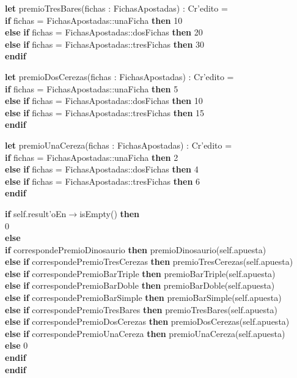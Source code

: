 \begin{itemize}
    \textbf{let} premioTresBares(fichas : FichasApostadas) : Cr'edito =\\
        \textbf{if} fichas = FichasApostadas::unaFicha \textbf{then} 10\\
        \textbf{else} \textbf{if} fichas = FichasApostadas::dosFichas \textbf{then} 20\\
        \textbf{else} \textbf{if} fichas = FichasApostadas::tresFichas \textbf{then} 30\\
        \textbf{endif}

    \textbf{let} premioDosCerezas(fichas : FichasApostadas) : Cr'edito =\\
        \textbf{if} fichas = FichasApostadas::unaFicha \textbf{then} 5\\
        \textbf{else} \textbf{if} fichas = FichasApostadas::dosFichas \textbf{then} 10\\
        \textbf{else} \textbf{if} fichas = FichasApostadas::tresFichas \textbf{then} 15\\
        \textbf{endif}

    \textbf{let} premioUnaCereza(fichas : FichasApostadas) : Cr'edito =\\
        \textbf{if} fichas = FichasApostadas::unaFicha \textbf{then} 2\\
        \textbf{else} \textbf{if} fichas = FichasApostadas::dosFichas \textbf{then} 4\\
        \textbf{else} \textbf{if} fichas = FichasApostadas::tresFichas \textbf{then} 6\\
        \textbf{endif}

    \textbf{if} self.result'oEn$\rightarrow$isEmpty() \textbf{then}\\
        0\\
    \textbf{else}\\
        \textbf{if} correspondePremioDinosaurio \textbf{then} premioDinosaurio(self.apuesta)\\
        \textbf{else} \textbf{if} correspondePremioTresCerezas \textbf{then} premioTresCerezas(self.apuesta)\\
        \textbf{else} \textbf{if} correspondePremioBarTriple \textbf{then} premioBarTriple(self.apuesta)\\
        \textbf{else} \textbf{if} correspondePremioBarDoble \textbf{then} premioBarDoble(self.apuesta)\\
        \textbf{else} \textbf{if} correspondePremioBarSimple \textbf{then} premioBarSimple(self.apuesta)\\
        \textbf{else} \textbf{if} correspondePremioTresBares \textbf{then} premioTresBares(self.apuesta)\\
        \textbf{else} \textbf{if} correspondePremioDosCerezas \textbf{then} premioDosCerezas(self.apuesta)\\
        \textbf{else} \textbf{if} correspondePremioUnaCereza \textbf{then} premioUnaCereza(self.apuesta)\\
        \textbf{else} 0\\
        \textbf{endif}\\
    \textbf{endif}


\end{itemize}
